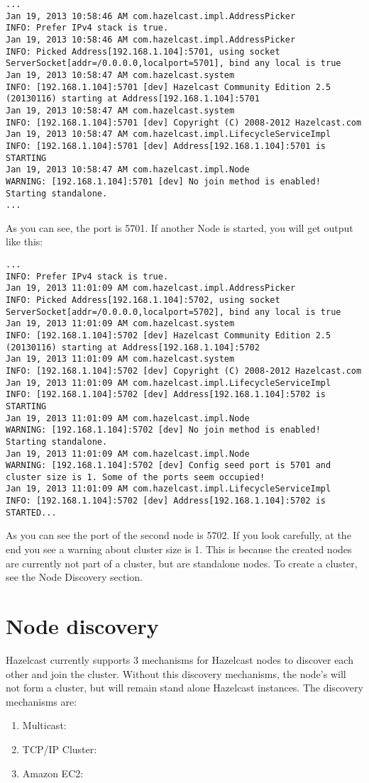 \begin{lstlisting}
...
Jan 19, 2013 10:58:46 AM com.hazelcast.impl.AddressPicker
INFO: Prefer IPv4 stack is true.
Jan 19, 2013 10:58:46 AM com.hazelcast.impl.AddressPicker
INFO: Picked Address[192.168.1.104]:5701, using socket ServerSocket[addr=/0.0.0.0,localport=5701], bind any local is true
Jan 19, 2013 10:58:47 AM com.hazelcast.system
INFO: [192.168.1.104]:5701 [dev] Hazelcast Community Edition 2.5 (20130116) starting at Address[192.168.1.104]:5701
Jan 19, 2013 10:58:47 AM com.hazelcast.system
INFO: [192.168.1.104]:5701 [dev] Copyright (C) 2008-2012 Hazelcast.com
Jan 19, 2013 10:58:47 AM com.hazelcast.impl.LifecycleServiceImpl
INFO: [192.168.1.104]:5701 [dev] Address[192.168.1.104]:5701 is STARTING
Jan 19, 2013 10:58:47 AM com.hazelcast.impl.Node
WARNING: [192.168.1.104]:5701 [dev] No join method is enabled! Starting standalone.
...
\end{lstlisting}
As you can see, the port is 5701. If another Node is started, you will get output like this:
\begin{lstlisting}
...
INFO: Prefer IPv4 stack is true.
Jan 19, 2013 11:01:09 AM com.hazelcast.impl.AddressPicker
INFO: Picked Address[192.168.1.104]:5702, using socket ServerSocket[addr=/0.0.0.0,localport=5702], bind any local is true
Jan 19, 2013 11:01:09 AM com.hazelcast.system
INFO: [192.168.1.104]:5702 [dev] Hazelcast Community Edition 2.5 (20130116) starting at Address[192.168.1.104]:5702
Jan 19, 2013 11:01:09 AM com.hazelcast.system
INFO: [192.168.1.104]:5702 [dev] Copyright (C) 2008-2012 Hazelcast.com
Jan 19, 2013 11:01:09 AM com.hazelcast.impl.LifecycleServiceImpl
INFO: [192.168.1.104]:5702 [dev] Address[192.168.1.104]:5702 is STARTING
Jan 19, 2013 11:01:09 AM com.hazelcast.impl.Node
WARNING: [192.168.1.104]:5702 [dev] No join method is enabled! Starting standalone.
Jan 19, 2013 11:01:09 AM com.hazelcast.impl.Node
WARNING: [192.168.1.104]:5702 [dev] Config seed port is 5701 and cluster size is 1. Some of the ports seem occupied!
Jan 19, 2013 11:01:09 AM com.hazelcast.impl.LifecycleServiceImpl
INFO: [192.168.1.104]:5702 [dev] Address[192.168.1.104]:5702 is STARTED...
\end{lstlisting}
As you can see the port of the second node is 5702. If you look carefully, at the end you see a warning about cluster size is 1. This is because the created nodes are currently not part of a cluster, but are standalone nodes. To create a cluster, see the Node Discovery section.

\section{Node discovery}
Hazelcast currently supports 3 mechanisms for Hazelcast nodes to discover each other and join the cluster. Without this discovery mechanisms, the node's will not form a cluster, but will remain stand alone Hazelcast instances. The discovery mechanisms are:
\begin{enumerate}
\item Multicast:
\item TCP/IP Cluster:
\item Amazon EC2:
\end{enumerate}

